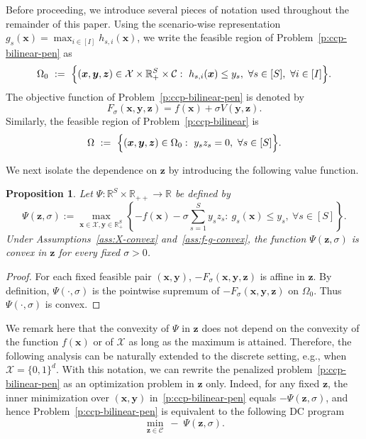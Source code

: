 \documentclass[11pt]{article}
\newtheorem{proposition}[theorem]{Proposition}
\def\bs{\boldsymbol}
\def\Re{\mathbb{R}}
\def\C{\mathcal{C}}
\def\X{\mathcal{X}}
\begin{document}
Before proceeding, we introduce several pieces of notation used throughout the remainder of this paper. 
Using the scenario-wise representation $g_s(\bs{x})=\max_{i\in[I]}h_{s,i}(\bs{x})$, we write the feasible region of Problem~\eqref{p:ccp-bilinear-pen} as
\begin{equation*} 
\Omega_0\ :=\ \Bigl\{(\bs{x},\bs{y},\bs{z})\in\X\times\Re_+^S\times\C:\ 
h_{s,i}(\bs{x})\le y_s,\ \forall s\in[S],\ \forall i\in[I]\Bigr\}.
\end{equation*}
The objective function of Problem~\eqref{p:ccp-bilinear-pen} is denoted by
\begin{equation*}
F_\sigma(\bs{x}, \bs{y}, \bs{z}) = f(\bs{x}) + \sigma V(\bs{y}, \bs{z}).
\end{equation*}
Similarly, the feasible region of Problem~\eqref{p:ccp-bilinear} is
\begin{equation*}
\Omega\ :=\ \Bigl\{(\bs{x},\bs{y},\bs{z})\in\Omega_0:\ y_s z_s=0,\ \forall s\in[S]\Bigr\}.
\end{equation*}

We next isolate the dependence on $\bs{z}$ by introducing the following value function.

\begin{proposition}
Let $\Psi:\Re^S\times\Re_{++}\to\Re$ be defined by
\begin{equation*}
\Psi(\bs{z},\sigma)
:=
\max_{\bs{x}\in\X,\bs{y}\in\Re^S_+}
\left\{
-f(\bs{x})-\sigma\sum_{s=1}^S y_s z_s
:\ g_s(\bs{x})\le y_s,\  \forall s\in[S]
\right\}.
\end{equation*}
Under Assumptions~\ref{ass:X-convex} and~\ref{ass:f-g-convex}, the function $\Psi(\bs{z},\sigma)$ is convex in $\bs{z}$ for every fixed $\sigma>0$.
\end{proposition}

\begin{proof}
For each fixed feasible pair $(\bs{x},\bs{y})$, $-F_\sigma(\bs{x}, \bs{y}, \bs{z})$ is affine in $\bs{z}$.
By definition, $\Psi(\cdot,\sigma)$ is the pointwise supremum of $-F_\sigma(\bs{x}, \bs{y}, \bs{z})$ on $\Omega_0$. Thus $\Psi(\cdot,\sigma)$ is convex.
\end{proof}

We remark here that the convexity of $\Psi$ in $\bs{z}$ does not depend on the convexity of the function $f(\bs{x})$ or of $\X$ as long as the maximum is attained. Therefore, the following analysis can be naturally extended to the discrete setting, e.g., when $\X = \{0,1\}^d$. With this notation, we can rewrite the penalized problem~\eqref{p:ccp-bilinear-pen} as an optimization problem in $\bs{z}$ only. Indeed, for any fixed $\bs{z}$, the inner minimization over $(\bs{x},\bs{y})$ in~\eqref{p:ccp-bilinear-pen} equals $-\Psi(\bs{z},\sigma)$, and hence Problem~\eqref{p:ccp-bilinear-pen} is equivalent to the following DC program
\begin{equation}\label{p:ccp-concave}
\min_{\bs{z}\in\C}\ - \; \Psi(\bs{z},\sigma).
\end{equation}
\end{document}
